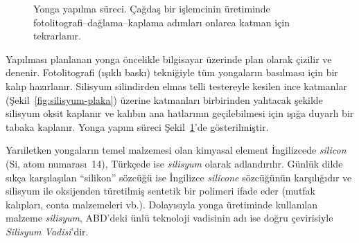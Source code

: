 \begin{figure}[H]
\caption[Yonga yapılma süreci]{Yonga yapılma süreci. Çağdaş bir işlemcinin üretiminde fotolitografi--dağlama--kaplama adımları onlarca katman için tekrarlanır.}
\label{fig:yonga-yapim}
\end{figure}

Yapılması planlanan yonga öncelikle bilgisayar üzerinde plan olarak çizilir ve denenir. Fotolitografi (ışıklı baskı) tekniğiyle tüm yongaların basılması için bir kalıp hazırlanır. Silisyum silindirden elmas telli testereyle kesilen ince katmanlar (Şekil~\ref{fig:silisyum-plaka}) üzerine katmanları birbirinden yalıtacak şekilde silisyum oksit kaplanır ve kalıbın ana hatlarının geçilebilmesi için ışığa duyarlı bir tabaka kaplanır. Yonga yapım süreci Şekil~\ref{fig:yonga-yapim}'de gösterilmiştir.

\begin{bilginot}
Yarıiletken yongaların temel malzemesi olan kimyasal element İngilizcede \emph{silicon} (Si, atom numarası~14), Türkçede ise \emph{silisyum} olarak adlandırılır. Günlük dilde sıkça karşılaşılan ``silikon'' sözcüğü ise İngilizce \emph{silicone} sözcüğünün karşılığıdır ve silisyum ile oksijenden türetilmiş sentetik bir polimeri ifade eder (mutfak kalıpları, conta malzemeleri vb.). Dolayısıyla yonga üretiminde kullanılan malzeme \emph{silisyum}, ABD'deki ünlü teknoloji vadisinin adı ise doğru çevirisiyle \emph{Silisyum Vadisi}'dir.
\end{bilginot}

